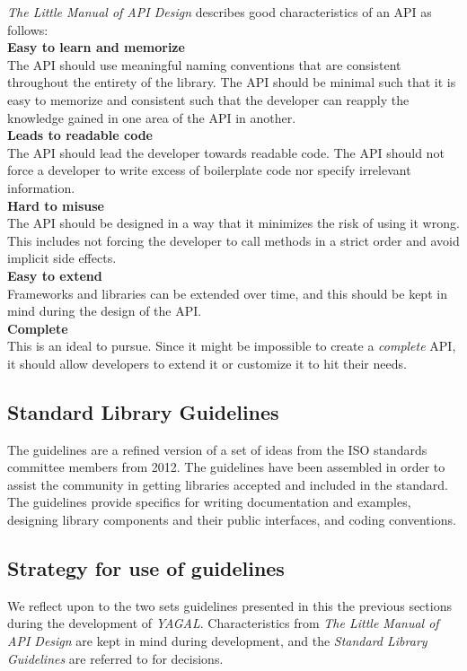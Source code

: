 \textit{The Little Manual of API Design} describes good characteristics of an API as follows:\\
\textbf{Easy to learn and memorize} \\ %
The API should use meaningful naming conventions that are consistent throughout the entirety of the library. The API should be minimal such that it is easy to memorize and consistent such that the developer can reapply the knowledge gained in one area of the API in another. \\
\textbf{Leads to readable code} \\
The API should lead the developer towards readable code. The API should not force a developer to write excess of boilerplate code nor specify irrelevant information.\\
\textbf{Hard to misuse} \\
The API should be designed in a way that it minimizes the risk of using it wrong. This includes not forcing the developer to call methods in a strict order and avoid implicit side effects. \\
\textbf{Easy to extend}\\
Frameworks and libraries can be extended over time, and this should be kept in mind during the design of the API. \\
\textbf{Complete} \\
This is an ideal to pursue. Since it might be impossible to create a \textit{complete} API, it should allow developers to extend it or customize it to hit their needs.  \\

\subsection{Standard Library Guidelines}
The guidelines are a refined version of a set of ideas from the ISO standards committee members from 2012. The guidelines have been assembled in order to assist the community in getting libraries accepted and included in the standard. The guidelines provide specifics for writing documentation and examples, designing library components and their public interfaces, and coding conventions.

\subsection{Strategy for use of guidelines}
We reflect upon to the two sets guidelines presented in this the previous sections during the development of \textit{YAGAL}. Characteristics from \textit{The Little Manual of API Design} are kept in mind during development, and the \textit{Standard Library Guidelines} are referred to for decisions.

